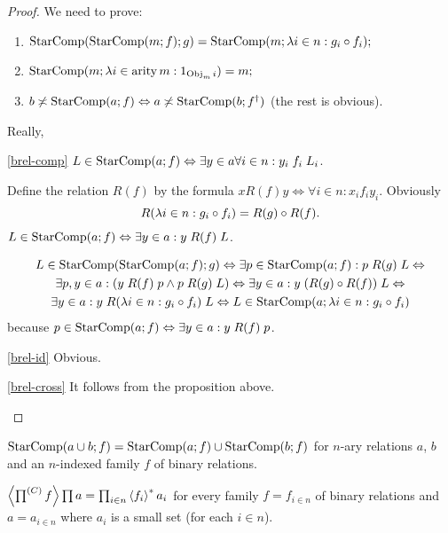 \begin{proof}
We need to prove:
\begin{enumerate}
\item \label{brel-comp}$\operatorname{StarComp}(\operatorname{StarComp}(m;f);g)=\operatorname{StarComp}(m;\lambda i\in n:g_{i}\circ f_{i});$
\item \label{brel-id}$\operatorname{StarComp}(m;\lambda i\in\operatorname{arity} m:1_{\operatorname{Obj}_{m}i})=m;$
\item \label{brel-cross}$b\not\asymp\operatorname{StarComp}(a;f)\Leftrightarrow a\not\asymp\operatorname{StarComp}(b;f^{\dagger})$
(the rest is obvious).
\end{enumerate}
Really,
\begin{widedisorder}
\item [{\ref{brel-comp}}] $L\in\operatorname{StarComp}(a;f)\Leftrightarrow\exists y\in a\forall i\in n:y_{i}\mathrel{f_{i}}L_{i}$.


Define the relation $R(f)$ by the formula $x\mathrel{R(f)}y\Leftrightarrow\forall i\in n:x_{i}\mathrel{f_{i}}y_{i}$.
Obviously 
\[
R(\lambda i\in n:g_{i}\circ f_{i})=R(g)\circ R(f).
\]
$L\in\operatorname{StarComp}(a;f)\Leftrightarrow\exists y\in a:y\mathrel{R(f)}L$.


\begin{multline*}
L\in\operatorname{StarComp}(\operatorname{StarComp}(a;f);g)\Leftrightarrow\exists p\in\operatorname{StarComp}(a;f):p\mathrel{R(g)}L\Leftrightarrow\\
\exists p,y\in a:(y\mathrel{R(f)}p\wedge p\mathrel{R(g)}L)\Leftrightarrow\exists y\in a:y\mathrel{(R(g)\circ R(f))}L\Leftrightarrow\\
\exists y\in a:y\mathrel{R(\lambda i\in n:g_{i}\circ f_{i})}L\Leftrightarrow L\in\operatorname{StarComp}(a;\lambda i\in n:g_{i}\circ f_{i})
\end{multline*}
 because $p\in\operatorname{StarComp}(a;f)\Leftrightarrow\exists y\in a:y\mathrel{R(f)}p$.

\item [{\ref{brel-id}}] Obvious.
\item [{\ref{brel-cross}}] It follows from the proposition above.
\end{widedisorder}
\end{proof}
\begin{obvious}
$\operatorname{StarComp}(a\cup b;f)=\operatorname{StarComp}(a;f)\cup\operatorname{StarComp}(b;f)$ for $n$-ary
relations $a$, $b$ and an $n$-indexed family $f$ of binary relations.\end{obvious}
\begin{thm}
$\left\langle \prod^{(C)}f\right\rangle\prod a=\prod_{i\in n}\left\langle f_{i}\right\rangle ^{\ast}a_{i}$
for every family $f=f_{i\in n}$ of binary relations and $a=a_{i\in n}$
where $a_{i}$ is a small set (for each $i\in n$).\end{thm}
